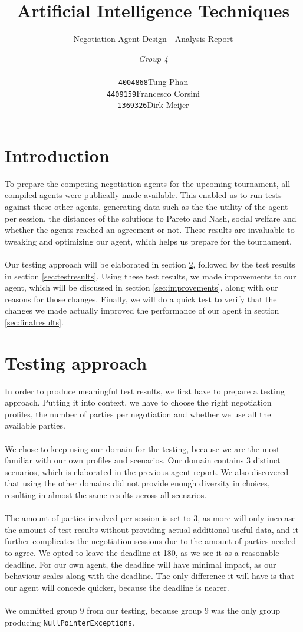 \documentclass[a4,11pt]{scrartcl}
\title{Artificial Intelligence Techniques}
\subtitle{Negotiation Agent Design - Analysis Report}
\author{\emph{Group 4}\\
\begin{tabular}{ll}
\texttt{4004868}&Tung Phan\\
\texttt{4409159}&Francesco Corsini\\
\texttt{1369326}&Dirk Meijer
\end{tabular}}
\begin{document}
\maketitle

\null\vfill
\tableofcontents
\pagebreak

\section{Introduction}
To prepare the competing negotiation agents for the upcoming tournament, all compiled agents were publically made available. This enabled us to run tests against these other agents, generating data such as the the utility of the agent per session, the distances of the solutions to Pareto and Nash, social welfare and whether the agents reached an agreement or not. These results are invaluable to tweaking and optimizing our agent, which helps us prepare for the tournament.
\\ \\
Our testing approach will be elaborated in section \ref{sec:testingapproach}, followed by the test results in section \ref{sec:testresults}. Using these test results, we made impovements to our agent, which will be discussed in section \ref{sec:improvements}, along with our reasons for those changes. Finally, we will do a quick test to verify that the changes we made actually improved the performance of our agent in section \ref{sec:finalresults}.
    
\section{Testing approach}
\label{sec:testingapproach}
In order to produce meaningful test results, we first have to prepare a testing approach. Putting it into context, we have to choose the right negotiation profiles, the number of parties per negotiation and whether we use all the available parties.
\\ \\
We chose to keep using our domain for the testing, because we are the most familiar with our own profiles and scenarios. Our domain contains 3 distinct scenarios, which is elaborated in the previous agent report. We also discovered that using the other domains did not provide enough diversity in choices, resulting in almost the same results across all scenarios. 
\\ \\
The amount of parties involved per session is set to 3, as more will only increase the amount of test results without providing actual additional useful data, and it further complicates the negotiation sessions due to the amount of parties needed to agree.
We opted to leave the deadline at 180, as we see it as a reasonable deadline. For our own agent, the deadline will have minimal impact, as our behaviour scales along with the deadline. The only difference it will have is that our agent will concede quicker, because the deadline is nearer.
\\ \\
We ommitted group 9 from our testing, because group 9 was the only group producing \verb|NullPointerExceptions|.
\end{document}
